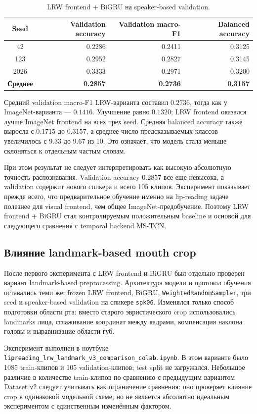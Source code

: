 \documentclass[12pt,a4paper]{article}
\begin{document}
\begin{table}[htbp]
\centering
\begin{tabular}{crrr}
\toprule
Seed & Validation accuracy & Validation macro-F1 & Balanced accuracy \\
\midrule
42 & 0.2286 & 0.2411 & 0.3125 \\
123 & 0.2952 & 0.2827 & 0.3145 \\
2026 & 0.3333 & 0.2971 & 0.3200 \\
\textbf{Среднее} & \textbf{0.2857} & \textbf{0.2736} & \textbf{0.3157} \\
\bottomrule
\end{tabular}
\caption{LRW frontend + BiGRU на speaker-based validation.}
\end{table}

Средний validation macro-F1 LRW-варианта составил $0.2736$, тогда как у
ImageNet-варианта --- $0.1416$. Улучшение равно $0.1320$; LRW frontend
оказался лучше ImageNet frontend на всех трех seed. Средняя balanced accuracy
также выросла с $0.1715$ до $0.3157$, а среднее число предсказываемых классов
увеличилось с 9.33 до 9.67 из 10. Это означает, что модель стала меньше
склоняться к отдельным частым словам.

При этом результат не следует интерпретировать как высокую абсолютную точность
распознавания. Validation accuracy $0.2857$ все еще невысока, а validation
содержит нового спикера и всего 105 клипов. Эксперимент показывает прежде
всего, что предварительное обучение именно на lip-reading задаче полезнее для
visual frontend, чем общее ImageNet-предобучение. Поэтому LRW frontend + BiGRU
стал контролируемым положительным baseline и основой для следующего сравнения
с temporal backend MS-TCN.

\subsection{Влияние landmark-based mouth crop}

После первого эксперимента с LRW frontend и BiGRU был отдельно проверен
вариант landmark-based preprocessing. Архитектура модели и протокол обучения
оставались теми же: frozen LRW frontend, BiGRU, \texttt{WeightedRandomSampler},
три seed и speaker-based validation на спикере \texttt{spk06}. Изменялся
только способ подготовки области рта: вместо старого эвристического crop
использовались landmarks лица, сглаживание координат между кадрами,
компенсация наклона головы и выравнивание области губ.

Эксперимент выполнен в ноутбуке
\texttt{lipreading\_lrw\_landmark\_v3\_comparison\_colab.ipynb}. В этом
варианте было 1085 train-клипов и 105 validation-клипов; test split не
загружался. Небольшое различие в количестве train-клипов по сравнению с
предыдущим вариантом Dataset v2 следует учитывать как ограничение сравнения:
оно проверяет влияние crop в одинаковой модельной схеме, но не является
абсолютно идеальным экспериментом с единственным изменённым фактором.
\end{document}
